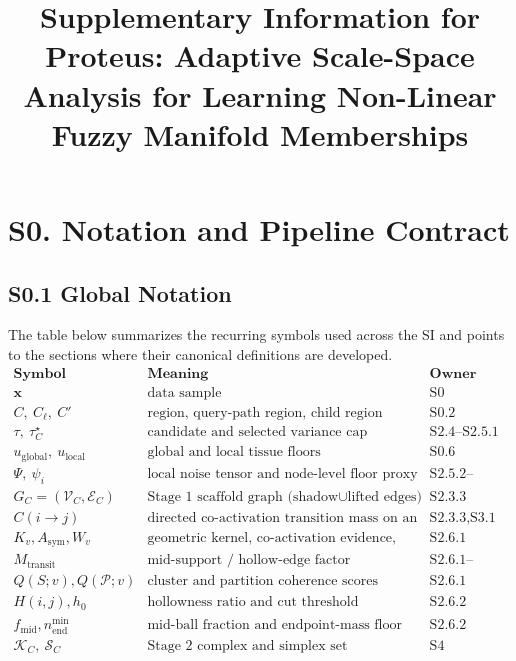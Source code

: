 \documentclass[11pt]{article}
\title{Supplementary Information for\\ Proteus: Adaptive Scale-Space Analysis for Learning Non-Linear Fuzzy Manifold Memberships}
\author{}
\date{}
\begin{document}
\maketitle

\section*{S0. Notation and Pipeline Contract}

\subsection*{S0.1 Global Notation}
The table below summarizes the recurring symbols used across the SI and points to the sections where their canonical definitions are developed.
\[
\begin{array}{lll}
\textbf{Symbol} & \textbf{Meaning} & \textbf{Owner}\\
\hline
\mathbf x & \text{data sample} & \text{S0}\\
C,\ C_\ell,\ C' & \text{region, query-path region, child region} & \text{S0.2}\\
\tau,\ \tau_C^\star & \text{candidate and selected variance cap} & \text{S2.4--S2.5.1}\\
u_{\mathrm{global}},\ u_{\mathrm{local}} & \text{global and local tissue floors} & \text{S0.6}\\
\Psi,\ \psi_i & \text{local noise tensor and node-level floor proxy} & \text{S2.5.2--S2.5.3}\\
G_C=(\mathcal V_C,\mathcal E_C) & \text{Stage 1 scaffold graph (shadow}\cup\text{lifted edges)} & \text{S2.3.3}\\
C(i\to j) & \text{directed co-activation transition mass on an edge} & \text{S2.3.3,S3.1}\\
K_v,A_{\mathrm{sym}},W_v & \text{geometric kernel, co-activation evidence, edge weight} & \text{S2.6.1}\\
M_{\mathrm{transit}} & \text{mid-support / hollow-edge factor (proposed)} & \text{S2.6.1--S2.6.2}\\
Q(S;v),Q(\mathcal P;v) & \text{cluster and partition coherence scores} & \text{S2.6.1}\\
H(i,j),h_0 & \text{hollowness ratio and cut threshold (proposed)} & \text{S2.6.2}\\
f_{\mathrm{mid}},n_{\mathrm{end}}^{\min} & \text{mid-ball fraction and endpoint-mass floor (proposed)} & \text{S2.6.2}\\
\mathcal K_C,\ \mathcal S_C & \text{Stage 2 complex and simplex set} & \text{S4}\\

\end{array}\]
\end{document}
